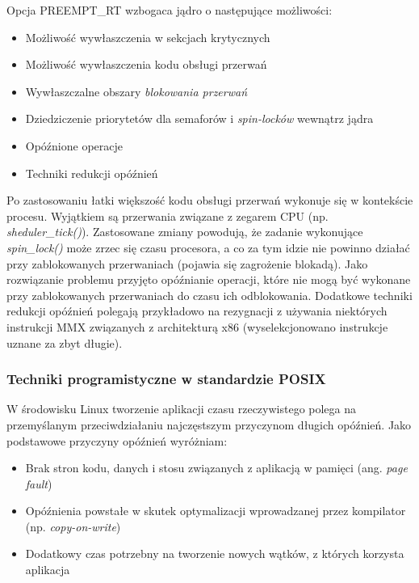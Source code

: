 Opcja PREEMPT\_RT wzbogaca jądro o następujące możliwości:

\begin{itemize}
\item Możliwość wywłaszczenia w sekcjach krytycznych
\item Możliwość wywłaszczenia kodu obsługi przerwań
\item Wywłaszczalne obszary \emph{blokowania przerwań}
\item Dziedziczenie priorytetów dla semaforów i \emph{spin-locków} wewnątrz jądra
\item Opóźnione operacje
\item Techniki redukcji opóźnień
\end{itemize}

Po zastosowaniu łatki większość kodu obsługi przerwań wykonuje się w kontekście procesu. Wyjątkiem są przerwania związane z zegarem CPU (np. \emph{sheduler\_tick()}). Zastosowane zmiany powodują, że zadanie wykonujące \emph{spin\_lock()} może zrzec się czasu procesora, a co za tym idzie nie powinno działać przy zablokowanych przerwaniach (pojawia się zagrożenie blokadą). Jako rozwiązanie problemu przyjęto opóźnianie operacji, które nie mogą być wykonane przy zablokowanych przerwaniach do czasu ich odblokowania. Dodatkowe techniki redukcji opóźnień polegają przykładowo na rezygnacji z używania niektórych instrukcji MMX związanych z architekturą x86 (wyselekcjonowano instrukcje uznane za zbyt długie).

\subsubsection{Techniki programistyczne w standardzie POSIX}

W środowisku Linux tworzenie aplikacji czasu rzeczywistego polega na przemyślanym przeciwdziałaniu najczęstszym przyczynom długich opóźnień. Jako podstawowe przyczyny opóźnień wyróżniam:

\begin{itemize}
\item Brak stron kodu, danych i stosu związanych z aplikacją w pamięci (ang. \emph{page fault})
\item Opóźnienia powstałe w skutek optymalizacji wprowadzanej przez kompilator (np. \emph{copy-on-write})
\item Dodatkowy czas potrzebny na tworzenie nowych wątków, z których korzysta aplikacja
\end{itemize}

